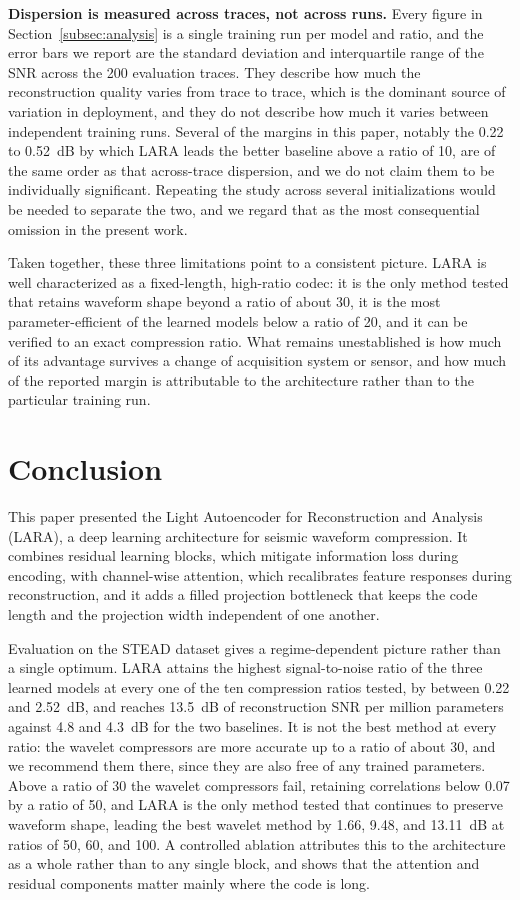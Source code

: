 \documentclass[fleqn,10pt]{wlscirep}
\begin{document}
\textbf{Dispersion is measured across traces, not across runs.} Every figure in Section~\ref{subsec:analysis} is a single training run per model and ratio, and the error bars we report are the standard deviation and interquartile range of the SNR across the 200 evaluation traces. They describe how much the reconstruction quality varies from trace to trace, which is the dominant source of variation in deployment, and they do not describe how much it varies between independent training runs. Several of the margins in this paper, notably the 0.22 to 0.52~dB by which LARA leads the better baseline above a ratio of 10, are of the same order as that across-trace dispersion, and we do not claim them to be individually significant. Repeating the study across several initializations would be needed to separate the two, and we regard that as the most consequential omission in the present work.

Taken together, these three limitations point to a consistent picture. LARA is well characterized as a fixed-length, high-ratio codec: it is the only method tested that retains waveform shape beyond a ratio of about 30, it is the most parameter-efficient of the learned models below a ratio of 20, and it can be verified to an exact compression ratio. What remains unestablished is how much of its advantage survives a change of acquisition system or sensor, and how much of the reported margin is attributable to the architecture rather than to the particular training run.

\section{Conclusion}
\label{sec:conclusion}

This paper presented the Light Autoencoder for Reconstruction and Analysis (LARA), a deep learning architecture for seismic waveform compression. It combines residual learning blocks, which mitigate information loss during encoding, with channel-wise attention, which recalibrates feature responses during reconstruction, and it adds a filled projection bottleneck that keeps the code length and the projection width independent of one another.

Evaluation on the STEAD dataset gives a regime-dependent picture rather than a single optimum. LARA attains the highest signal-to-noise ratio of the three learned models at every one of the ten compression ratios tested, by between 0.22 and 2.52~dB, and reaches 13.5~dB of reconstruction SNR per million parameters against 4.8 and 4.3~dB for the two baselines. It is not the best method at every ratio: the wavelet compressors are more accurate up to a ratio of about 30, and we recommend them there, since they are also free of any trained parameters. Above a ratio of 30 the wavelet compressors fail, retaining correlations below 0.07 by a ratio of 50, and LARA is the only method tested that continues to preserve waveform shape, leading the best wavelet method by 1.66, 9.48, and 13.11~dB at ratios of 50, 60, and 100. A controlled ablation attributes this to the architecture as a whole rather than to any single block, and shows that the attention and residual components matter mainly where the code is long.
\end{document}

